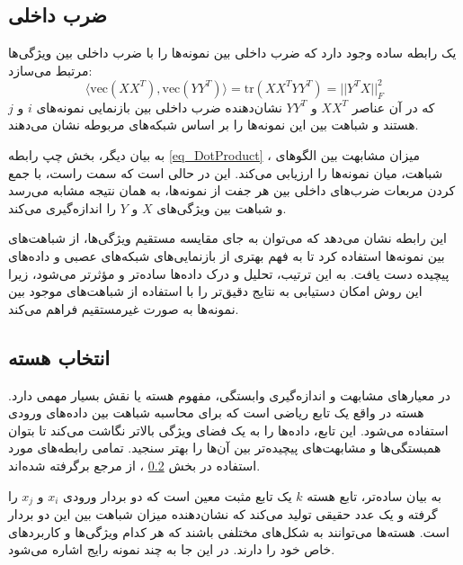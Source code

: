 \subsection{
	ضرب داخلی%
}
یک رابطه ساده وجود دارد که ضرب داخلی بین نمونه‌ها را با ضرب داخلی بین ویژگی‌ها مرتبط می‌سازد:
\begin{equation}
	\langle \text{vec}(XX^T), \text{vec}(YY^T) \rangle = \text{tr}(XX^TYY^T) = ||Y^TX||_F^2
	\label{eq_DotProduct}
\end{equation}
که در آن عناصر \(XX^T\) و \(YY^T\) نشان‌دهنده ضرب داخلی بین بازنمایی نمونه‌های \(i\) و \(j\) هستند و شباهت بین این نمونه‌ها را بر اساس شبکه‌های مربوطه نشان می‌دهند. 

به بیان دیگر، بخش چپ رابطه
\eqref{eq_DotProduct}%
، میزان مشابهت بین الگوهای شباهت، میان نمونه‌ها را ارزیابی می‌کند. این در حالی است که سمت راست، با جمع کردن مربعات ضرب‌های داخلی بین هر جفت از نمونه‌ها، به همان نتیجه مشابه می‌رسد و شباهت بین ویژگی‌های \(X\) و \(Y\) را اندازه‌گیری می‌کند.

این رابطه نشان می‌دهد که می‌توان به جای مقایسه مستقیم ویژگی‌ها، از شباهت‌های بین نمونه‌ها استفاده کرد تا به فهم بهتری از بازنمایی‌های شبکه‌های عصبی و داده‌های پیچیده دست یافت. به این ترتیب، تحلیل و درک داده‌ها ساده‌تر و مؤثرتر می‌شود، زیرا این روش امکان دستیابی به نتایج دقیق‌تر را با استفاده از شباهت‌های موجود بین نمونه‌ها به صورت غیرمستقیم فراهم می‌کند.




\subsection{
	انتخاب هسته%
}\label{sec_kernel_selection}
در معیارهای مشابهت و اندازه‌گیری وابستگی، مفهوم هسته یا
نقش بسیار مهمی دارد. هسته در واقع یک تابع ریاضی است که برای محاسبه شباهت بین داده‌های ورودی استفاده می‌شود. این تابع، داده‌ها را به یک فضای ویژگی بالاتر نگاشت می‌کند تا بتوان همبستگی‌ها و مشابهت‌های پیچیده‌تر بین آن‌ها را بهتر سنجید.
تمامی رابطه‌های مورد استفاده در بخش
\ref{sec_kernel_selection}%
، از مرجع 
\cite{kornblith2019similarity} 
برگرفته شده‌اند.


به بیان ساده‌تر، تابع هسته \( k \) یک تابع مثبت معین است که دو بردار ورودی \( x_i \) و \( x_j \) را گرفته و یک عدد حقیقی تولید می‌کند که نشان‌دهنده میزان شباهت بین این دو بردار است. هسته‌ها می‌توانند به شکل‌های مختلفی باشند که هر کدام ویژگی‌ها و کاربردهای خاص خود را دارند. در این جا به چند نمونه رایج اشاره می‌شود.

